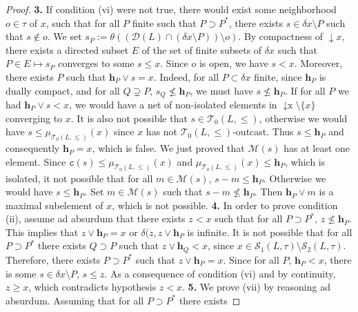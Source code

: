 \documentclass{article}
\begin{document}
\begin{proof}
\textbf{3.} {If condition (vi) were not true, there would exist some neighborhood $o \in \tau$ of $x$, 
such that for all $P$ finite such that $P \supset P^*$, 
there exists $s \in \delta x \setminus P$ such that 
$s \notin o$. We set $s_P := \theta((\mathcal{D}(L) \cap (\delta x \setminus P)) \setminus o)$.
By compactness of $\mathop{\downarrow}x$, 
there exists a directed subset $E$ of the set of finite subsets of $\delta x$ such that 
$P \in E \mapsto s_P$ converges to some $s \le x$.
Since $o$ is open, we have $s < x$. Moreover, there exists $P$ such that 
$\boldsymbol{h}_P \vee s = x$. Indeed, for all $P \subset \delta x$ finite, since $\boldsymbol{h}_P$ is dually compact, and for all $Q \supsetneq P$, $s_{Q} \not \le \boldsymbol{h}_P$, 
we must have $s \not \le \boldsymbol{h}_{P}$. If for all $P$ we had $\boldsymbol{h}_P \vee s < x$, we would have a net of non-isolated elements in $\mathop{\downarrow x} \setminus\{x\}$ converging to $x$. It is also not possible that $s \in \mathcal{T}_0(L,\le)$, otherwise we would have $s \le \mu_{\mathcal{T}_0(L,\le)}(x)$ since $x$ has not $\mathcal{T}_0(L,\le)$-outcast. Thus $s\le \boldsymbol{h}_P$ and consequently $\boldsymbol{h}_P = x$, which is false. 
We just proved that $\mathcal{M}(s)$ has at least one element. Since $\texttt{c}(s) \le \mu_{\mathcal{T}_0(L,\le)}(x)$ and $\mu_{\mathcal{T}_0(L,\le)}(x) \le \boldsymbol{h}_P$, which is isolated, it not possible that for all $m \in \mathcal{M}(s)$, $s-m \le \boldsymbol{h}_P$. Otherwise we would have $s \le \boldsymbol{h}_P$. Set $m \in \mathcal{M}(s)$ such that $s-m \not \le \boldsymbol{h}_P$. Then $\boldsymbol{h}_P \vee m$ is a maximal subelement of $x$, which is not possible.
}
\textbf{4.} In order to prove condition (ii), 
assume ad absurdum that there exists $z < x$ such that 
for all $P \supset P^*$, $z \not \le \boldsymbol{h}_{P}$.
This implies that $z \vee \boldsymbol{h}_{P} = x$ or 
$\delta(z,z \vee \boldsymbol{h}_{P}$ is infinite.
It is not possible that for all $P\supset P^*$ there exists $Q \supset P$ such that $z \vee \boldsymbol{h}_{Q} < x$, since $x \in \mathcal{S}_1(L,\tau) \setminus \mathcal{S}_2(L,\tau)$. Therefore, there exists 
$P \supset P^*$ such that $z \vee \boldsymbol{h}_{P} = x$. Since for all $P$, $\boldsymbol{h}_P < x$, there is some $s \in \delta x \setminus P$, $s \le z$. As a consequence of condition (vi) and by continuity, $z \ge x$, which contradicts hypothesis $z < x$. 
\textbf{5.} We prove (vii) by reasoning ad absurdum. 
Assuming that for all $P \supset P^*$ there exists

\end{proof}
\end{document}

